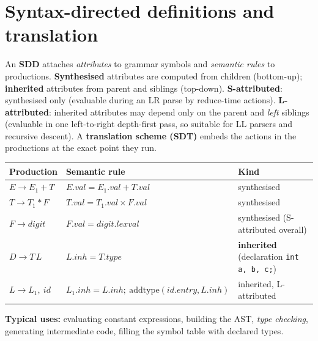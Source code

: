 \documentclass[10pt,a4paper,openany,oneside]{report}
\newcommand{\prio}[1]{\texorpdfstring{\ifcase#1\or{\color{gold}\ding{72}}\or{\color{gold}\ding{72}\ding{72}}\or{\color{gold}\ding{72}\ding{72}\ding{72}}\fi}{}}
\begin{document}
\section{Syntax-directed definitions and translation \prio{2}}
\begin{mustbox}
An \textbf{SDD} attaches \emph{attributes} to grammar symbols and \emph{semantic rules} to productions. \textbf{Synthesised} attributes are computed from children (bottom-up); \textbf{inherited} attributes from parent and siblings (top-down). \textbf{S-attributed}: synthesised only (evaluable during an LR parse by reduce-time actions). \textbf{L-attributed}: inherited attributes may depend only on the parent and \emph{left} siblings (evaluable in one left-to-right depth-first pass, so suitable for LL parsers and recursive descent). A \textbf{translation scheme (SDT)} embeds the actions in the productions at the exact point they run.
\end{mustbox}
\begin{center}\small
\begin{xltabular}{\textwidth}{@{}L{3.0cm}L{5.8cm}Y@{}}
\toprule
\textbf{Production} & \textbf{Semantic rule} & \textbf{Kind}\\
\midrule\endhead
$E\to E_1+T$ & $E.val = E_1.val + T.val$ & synthesised\\
$T\to T_1*F$ & $T.val = T_1.val\times F.val$ & synthesised\\
$F\to \textit{digit}$ & $F.val = \textit{digit}.lexval$ & synthesised (S-attributed overall)\\
$D\to T\,L$ & $L.inh = T.type$ & \textbf{inherited} (declaration \texttt{int a, b, c;})\\
$L\to L_1,\ \textit{id}$ & $L_1.inh = L.inh;\ \mathrm{addtype}(\textit{id}.entry, L.inh)$ & inherited, L-attributed\\
\bottomrule
\end{xltabular}
\end{center}
\textbf{Typical uses:} evaluating constant expressions, building the AST, \emph{type checking}, generating intermediate code, filling the symbol table with declared types.
\end{document}
